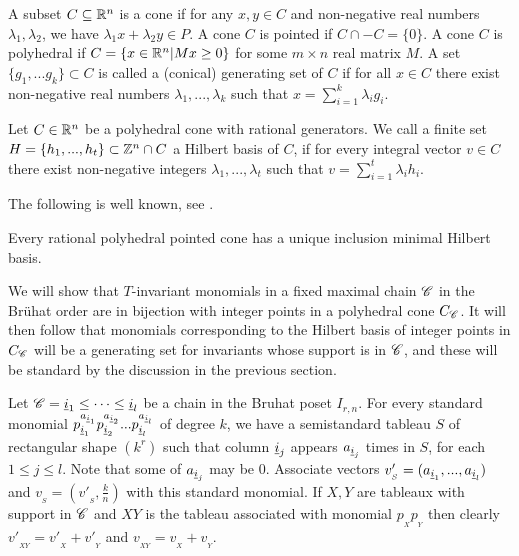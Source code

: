 \begin{definition}[Cone]
    A  subset \(C \subseteq  \mathbb{R}^n\) is a cone if for any \(x,y\in C\) and non-negative real numbers \(\lambda_1,\lambda_2\), we have \(\lambda_1 x + \lambda_2 y \in P\). A cone \(C\) is pointed if \(C \cap -C = \{0\}\). 
    A cone \(C\) is polyhedral if \(C = \{ x \in \mathbb{R}^n | Mx \ge 0\}\) for some $m \times n$ real matrix \(M\). 
    A set $\{g_1,...g_k\} \subset C$ is called a (conical) generating set  of \(C\) if for all \(x \in C\) there exist non-negative real numbers \(\lambda_1,...,\lambda_k\) such that \(x = \sum_{i=1}^k \lambda_i g_i\).
\end{definition}

\begin{definition}
    Let \(C \in \mathbb{R}^n\) be a polyhedral cone with rational generators. 
    We call a finite set \(H = \{h_1,...,h_t\} \subset \mathbb{Z}^n \cap C\) a Hilbert basis of $C$,
   if for every integral vector $v \in C$ there exist non-negative integers \(\lambda_1,...,\lambda_t\) such that 
    $v=\sum_{i=1}^t \lambda_i h_i.$ 
  \end{definition} 
  
  The following is well known, see \cite[Theorem ?]{schrijver1998theory}.   
 \begin{proposition}
Every rational polyhedral pointed cone has a unique inclusion minimal Hilbert basis.
 \end{proposition}
 
We will show that $T$-invariant monomials in a fixed maximal chain $\mathscr{C}$ in the Br\"{u}hat order are in bijection with integer points in a polyhedral cone $C_{\mathscr{C}}$. It will then follow that monomials corresponding to the Hilbert basis of integer points in $C_{\mathscr{C}}$ will be a generating set for invariants whose support is in $\mathscr{C}$, and these will be standard by the discussion in the previous section.

Let \(\mathscr{C} = {\underline{i}_1} \le \cdots \le  {\underline{i}_l}\) be a chain in the Bruhat poset \(I_{r,n}\). For every standard monomial \(p_{\underline{i}_1}^{a_{\underline{i}_1}}p_{\underline{i}_2}^{a_{\underline{i}_2}}...p_{\underline{i}_l}^{a_{\underline{i}_l}}\) of degree \(k\), we have a semistandard tableau \(S\) of rectangular shape \((k^r)\) such that column \(\underline{i}_j\) appears \(a_{\underline{i}_j}\) times in \(S\), for  each \(1 \le j \le l\). Note that some of \(a_{{\underline i}_j}\) may be \(0\). 
Associate vectors \(v'_{_S} = (a_{\underline{i}_1},...,a_{\underline{i}_l})\) and \(v_{_S} = (v'_{_S},\frac{k}{n})\) with this standard monomial.
If \(X,Y\) are tableaux with support in \(\mathscr{C}\)  and \(XY\) is the tableau associated with monomial \(p_{_X}p_{_Y}\) then clearly \(v'_{_{XY}} = v'_{_X} + v'_{_Y}\) and \(v_{_{XY}} = v_{_X}+v_{_Y}\).

